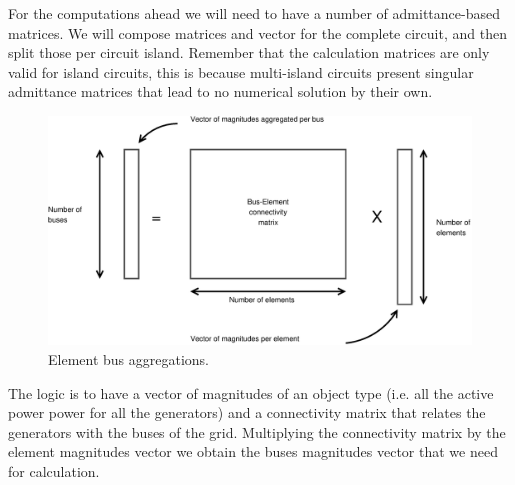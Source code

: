 \documentclass[nols,a4paper,twoside,notoc,fleqn]{tufte-book}
\begin{document}
For the computations ahead we will need to have a number of admittance-based matrices. We will compose matrices and vector for the complete circuit, and then split those per circuit island. Remember that the calculation matrices are only valid for island circuits, this is because multi-island circuits present singular admittance matrices that lead to no numerical solution by their own.

\begin{figure}[h!]
	\centering
	\includegraphics[width=0.99\linewidth]{img/ElementBusAgregation.eps}
	\caption{Element bus aggregations.}
	\label{fig:ElementBusAgregation}
\end{figure}

The logic is to have a vector of magnitudes of an object type (i.e. all the active power power for all the generators) and a connectivity matrix that relates the generators with the buses of the grid. Multiplying the connectivity matrix by the element magnitudes vector we obtain the buses magnitudes vector that we need for calculation.


%
%
%
%
\end{document}
